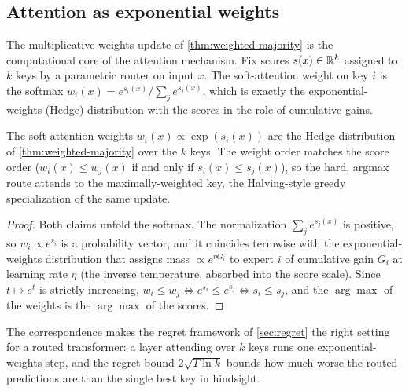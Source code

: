 
\subsection{Attention as exponential weights}
\label{sec:attention-online}

The multiplicative-weights update of \cref{thm:weighted-majority} is the computational core of the attention mechanism.  Fix scores $s(x) \in \mathbb{R}^k$ assigned to $k$ keys by a parametric router on input $x$.  The soft-attention weight on key $i$ is the softmax $w_i(x) = e^{s_i(x)} / \sum_j e^{s_j(x)}$, which is exactly the exponential-weights (Hedge) distribution with the scores in the role of cumulative gains.

\begin{prop}
\label{prop:attention-hedge}
The soft-attention weights $w_i(x) \propto \exp(s_i(x))$ are the Hedge distribution of \cref{thm:weighted-majority} over the $k$ keys. The weight order matches the score order ($w_i(x) \le w_j(x)$ if and only if $s_i(x) \le s_j(x)$), so the hard, argmax route attends to the maximally-weighted key, the Halving-style greedy specialization of the same update.
\end{prop}

\begin{proof}
Both claims unfold the softmax.  The normalization $\sum_j e^{s_j(x)}$ is positive, so $w_i \propto e^{s_i}$ is a probability vector, and it coincides termwise with the exponential-weights distribution that assigns mass $\propto e^{\eta G_i}$ to expert $i$ of cumulative gain $G_i$ at learning rate $\eta$ (the inverse temperature, absorbed into the score scale).  Since $t \mapsto e^t$ is strictly increasing, $w_i \le w_j \Leftrightarrow e^{s_i} \le e^{s_j} \Leftrightarrow s_i \le s_j$, and the $\arg\max$ of the weights is the $\arg\max$ of the scores.
\end{proof}

The correspondence makes the regret framework of \cref{sec:regret} the right setting for a routed transformer: a layer attending over $k$ keys runs one exponential-weights step, and the regret bound $2\sqrt{T \ln k}$ bounds how much worse the routed predictions are than the single best key in hindsight.

